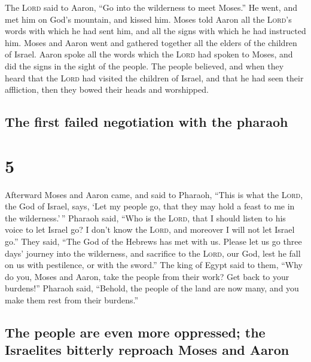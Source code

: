  The \textsc{Lord} said to Aaron, ``Go into the
wilderness to meet Moses.'' He went, and met him on God's mountain, and
kissed him.  Moses told Aaron all the \textsc{Lord}'s
words with which he had sent him, and all the signs with which he had
instructed him.  Moses and Aaron went and gathered
together all the elders of the children of Israel.  Aaron
spoke all the words which the \textsc{Lord} had spoken to Moses, and did
the signs in the sight of the people.  The people
believed, and when they heard that the \textsc{Lord} had visited the
children of Israel, and that he had seen their affliction, then they
bowed their heads and worshipped.

\hypertarget{the-first-failed-negotiation-with-the-pharaoh}{%
\subsection{The first failed negotiation with the
pharaoh}\label{the-first-failed-negotiation-with-the-pharaoh}}

\hypertarget{section-4}{%
\section{5}\label{section-4}}

 Afterward Moses and Aaron came, and said to Pharaoh,
``This is what the \textsc{Lord}, the God of Israel, says, `Let my
people go, that they may hold a feast to me in the wilderness.'\,''
 Pharaoh said, ``Who is the \textsc{Lord}, that I should
listen to his voice to let Israel go? I don't know the \textsc{Lord},
and moreover I will not let Israel go.''  They said, ``The
God of the Hebrews has met with us. Please let us go three days' journey
into the wilderness, and sacrifice to the \textsc{Lord}, our God, lest
he fall on us with pestilence, or with the sword.''  The
king of Egypt said to them, ``Why do you, Moses and Aaron, take the
people from their work? Get back to your burdens!'' 
Pharaoh said, ``Behold, the people of the land are now many, and you
make them rest from their burdens.''

\hypertarget{the-people-are-even-more-oppressed-the-israelites-bitterly-reproach-moses-and-aaron}{%
\subsection{The people are even more oppressed; the Israelites bitterly
reproach Moses and
Aaron}\label{the-people-are-even-more-oppressed-the-israelites-bitterly-reproach-moses-and-aaron}}

